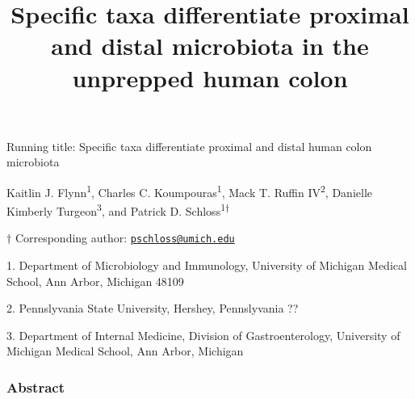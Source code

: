 \documentclass[11pt,]{article}
\title{Specific taxa differentiate proximal and distal microbiota in the
unprepped human colon}
\author{}
\date{}
\begin{document}
\maketitle

\vspace{35mm}

Running title: Specific taxa differentiate proximal and distal human
colon microbiota

\vspace{35mm}

Kaitlin J. Flynn\textsuperscript{1}, Charles C.
Koumpouras\textsuperscript{1}, Mack T. Ruffin IV\textsuperscript{2},
Danielle Kimberly Turgeon\textsuperscript{3}, and Patrick D.
Schloss\textsuperscript{1\(\dagger\)}

\vspace{35mm}

\(\dagger\) Corresponding author:
\href{mailto:pschloss@umich.edu}{\nolinkurl{pschloss@umich.edu}}

1. Department of Microbiology and Immunology, University of Michigan
Medical School, Ann Arbor, Michigan 48109

2. Pennslyvania State University, Hershey, Pennslyvania ??

3. Department of Internal Medicine, Division of Gastroenterology,
University of Michigan Medical School, Ann Arbor, Michigan

\newpage

\subsubsection{Abstract}\label{abstract}
\end{document}
